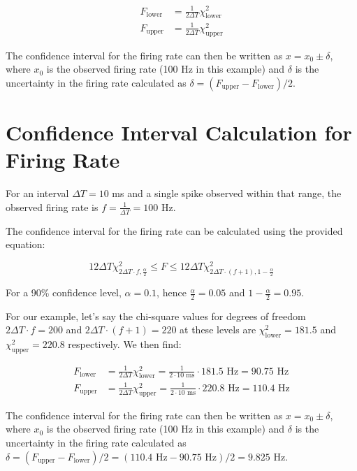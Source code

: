 \begin{align*}
F_{\text{lower}} &= \frac{1}{2\Delta T} \chi^{2}_{\text{lower}} \\
F_{\text{upper}} &= \frac{1}{2\Delta T} \chi^{2}_{\text{upper}}
\end{align*}

The confidence interval for the firing rate can then be written as $x = x_0 \pm \delta$, where $x_0$ is the observed firing rate (100 Hz in this example) and $\delta$ is the uncertainty in the firing rate calculated as $\delta = (F_{\text{upper}} - F_{\text{lower}}) / 2$.


\section*{Confidence Interval Calculation for Firing Rate}

For an interval $\Delta T = 10$ ms and a single spike observed within that range, the observed firing rate is $f = \frac{1}{\Delta T} = 100$ Hz. 

The confidence interval for the firing rate can be calculated using the provided equation:

\begin{equation}
12\Delta T \chi^{2}_{2\Delta T \cdot f, \frac{\alpha}{2}} \leq F \leq 12 \Delta T \chi^{2}_{2\Delta T \cdot (f+1), 1-\frac{\alpha}{2}}
\end{equation}

For a 90\% confidence level, $\alpha = 0.1$, hence $\frac{\alpha}{2} = 0.05$ and $1-\frac{\alpha}{2} = 0.95$. 

For our example, let's say the chi-square values for degrees of freedom $2\Delta T \cdot f = 200$ and $2\Delta T \cdot (f+1) = 220$ at these levels are $\chi^{2}_{\text{lower}} = 181.5$ and $\chi^{2}_{\text{upper}} = 220.8$ respectively. We then find:

\begin{align*}
F_{\text{lower}} &= \frac{1}{2\Delta T} \chi^{2}_{\text{lower}} = \frac{1}{2 \cdot 10 \text{ ms}} \cdot 181.5 \text{ Hz} = 90.75 \text{ Hz} \\
F_{\text{upper}} &= \frac{1}{2\Delta T} \chi^{2}_{\text{upper}} = \frac{1}{2 \cdot 10 \text{ ms}} \cdot 220.8 \text{ Hz} = 110.4 \text{ Hz}
\end{align*}

The confidence interval for the firing rate can then be written as $x = x_0 \pm \delta$, where $x_0$ is the observed firing rate (100 Hz in this example) and $\delta$ is the uncertainty in the firing rate calculated as $\delta = (F_{\text{upper}} - F_{\text{lower}}) / 2 = (110.4 \text{ Hz} - 90.75 \text{ Hz}) / 2 = 9.825 \text{ Hz}$.

